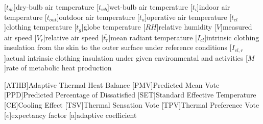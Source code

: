 \documentclass[a4paper, 10pt]{letter}
\begin{document}
    \renewcommand{\baselinestretch}{0.75}\normalsize
    \renewcommand{\aclabelfont}[1]{\textsc{\acsfont{#1}}}

    [$t_{db}$]{dry-bulb air temperature}
    [$t_{wb}$]{wet-bulb air temperature}
    [$t_{i}$]{indoor air temperature}
    [$t_{out}$]{outdoor air temperature}
    [$t_{o}$]{operative air temperature}
    [$t_{cl}$]{clothing temperature}
    [$t_{g}$]{globe temperature}
    [$RH$]{relative humidity\acroextra{, \%}}
    [$V$]{measured air speed}
    [$V_{r}$]{relative air speed}
    [$\overline{t_{r}}$]{mean radiant temperature}
    [$I_{cl}$]{intrinsic clothing insulation from the skin to the outer surface under reference conditions}
    [$I_{cl,r}$]{actual intrinsic clothing insulation under given environmental and activities}
    [$M$]{rate of metabolic heat production}

    [ATHB]{Adaptive Thermal Heat Balance}
    [PMV]{Predicted Mean Vote}
    [PPD]{Predicted Percentage of Dissatisfied\acroextra{, \%}}
    [SET]{Standard Effective Temperature}
    [CE]{Cooling Effect}
    [TSV]{Thermal Sensation Vote}
    [TPV]{Thermal Preference Vote}
    [$e$]{expectancy factor}
    [a]{adaptive coefficient}
\end{document}

